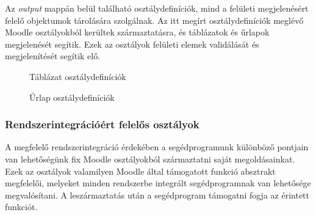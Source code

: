 Az \textit{output} mappán belül található osztálydefiníciók, mind a felületi megjelenésért felelő objektumok tárolására szolgálnak. Az itt megírt osztálydefiníciók meglévő Moodle osztályokból kerültek származtatásra, és táblázatok és űrlapok megjelenését segítik. Ezek az osztályok felületi elemek validálását és megjelenítését segítik elő. 
\begin{figure}[H]
	\caption{Táblázat osztálydefiníciók}
\end{figure}

\begin{figure}[H]
	\caption{Űrlap osztálydefiníciók}
\end{figure}
\subsubsection{Rendszerintegrációért felelős osztályok}

A megfelelő rendszerintegráció érdekében a segédprogramunk különböző pontjain van lehetőségünk fix Moodle osztályokból származtatni saját megoldásainkat. Ezek az osztályok valamilyen Moodle által támogatott funkció absztrakt megfelelői, melyeket minden rendszerbe integrált segédprogramnak van lehetősége megvalósítani. A leszármaztatás után a segédprogram támogatni fogja az érintett funkciót.

